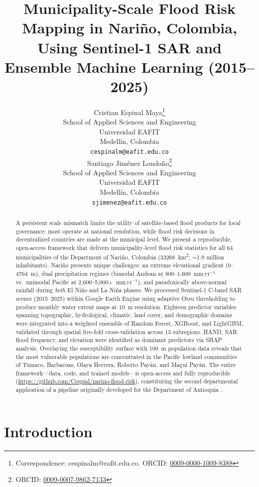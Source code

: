 \documentclass{article}
\title{Municipality-Scale Flood Risk Mapping in Nari\~no, Colombia, Using Sentinel-1 SAR and Ensemble Machine Learning (2015--2025)}
\author{
  Cristian Espinal Maya\thanks{Correspondence: cespinalm@eafit.edu.co. ORCID: \href{https://orcid.org/0009-0000-1009-8388}{0009-0000-1009-8388}} \\
  School of Applied Sciences and Engineering\\
  Universidad EAFIT\\
  Medell\'in, Colombia \\
  \texttt{cespinalm@eafit.edu.co} \\
  \And
  Santiago Jim\'enez Londo\~no\thanks{ORCID: \href{https://orcid.org/0009-0007-9862-7133}{0009-0007-9862-7133}} \\
  School of Applied Sciences and Engineering\\
  Universidad EAFIT\\
  Medell\'in, Colombia \\
  \texttt{sjimenez@eafit.edu.co} \\
}
\begin{document}
\maketitle

\begin{abstract}
A persistent scale mismatch limits the utility of satellite-based flood products for local governance: most operate at national resolution, while flood risk decisions in decentralized countries are made at the municipal level. We present a reproducible, open-access framework that delivers municipality-level flood risk statistics for all 64 municipalities of the Department of Nari\~no, Colombia (\SI{33268}{\kilo\metre\squared}; $\sim$1.9 million inhabitants). Nari\~no presents unique challenges: an extreme elevational gradient (0--\SI{4764}{\metre}), dual precipitation regimes (bimodal Andean at 800--1,600~mm\,yr$^{-1}$ vs.\ unimodal Pacific at 2,600--5,000+~mm\,yr$^{-1}$), and paradoxically above-normal rainfall during \textit{both} El Ni\~no and La Ni\~na phases. We processed Sentinel-1 C-band SAR scenes (2015--2025) within Google Earth Engine using adaptive Otsu thresholding to produce monthly water extent maps at \SI{10}{\metre} resolution. Eighteen predictor variables spanning topographic, hydrological, climatic, land cover, and demographic domains were integrated into a weighted ensemble of Random Forest, XGBoost, and LightGBM, validated through spatial five-fold cross-validation across 13 subregions. HAND, SAR flood frequency, and elevation were identified as dominant predictors via SHAP analysis. Overlaying the susceptibility surface with \SI{100}{\metre} population data reveals that the most vulnerable populations are concentrated in the Pacific lowland communities of Tumaco, Barbacoas, Olaya Herrera, Roberto Pay\'an, and Magu\'i Pay\'an. The entire framework---data, code, and trained models---is open-access and fully reproducible (\url{https://github.com/Cespial/narino-flood-risk}), constituting the second departmental application of a pipeline originally developed for the Department of Antioquia \citep{EspinalMaya2026Antioquia}.
\end{abstract}


\section{Introduction}
\label{sec:introduction}
\end{document}
